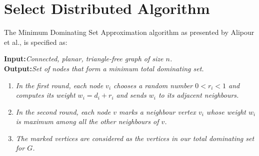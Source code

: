\section{Select Distributed Algorithm}\label{subsec:algorithm}
The Minimum Dominating Set Approximation algorithm as presented by Alipour et al., is specified as:

\textbf{Input:}\textit{Connected, planar, triangle-free graph of size $n$.}\\
\textbf{Output:}\textit{Set of nodes that form a minimum total dominating set.}\\
\vspace{-1.5em}
\begin{enumerate}[noitemsep]
\itemsep-1.5em
\item \textit{In the first round, each node $v_i$ chooses a random number $0<r_i<1$ and computes its weight $w_i=d_i+r_i$ and sends $w_i$ to its adjacent neighbours.}\\
\item \textit{In the second round, each node $v$ marks a neighbour vertex $v_i$ whose weight $w_i$ is maximum among all the other neighbours of $v$.}\\
\vspace{1em}
\item \textit{The marked vertices are considered as the vertices in our total dominating set for $G$.}
\end{enumerate}

